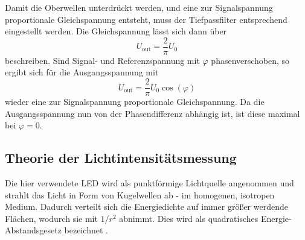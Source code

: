 Damit die Oberwellen unterdrückt werden, und eine zur Signalspannung proportionale
Gleichspannung entsteht, muss der Tiefpassfilter entsprechend eingestellt werden.
Die Gleichspannung lässt sich dann über
\begin{equation}
  U_\text{out}=\frac{2}{\pi}U_0
\end{equation}
beschreiben.
Sind Signal- und Referenzspannung mit $\varphi$ phasenverschoben, so ergibt sich für
die Ausgangsspannung mit
\begin{equation}
  U_\text{out}=\frac{2}{\pi}U_0\cos(\varphi) \label{eqn:out}
\end{equation}
wieder eine zur Signalspannung proportionale Gleichspannung. Da die Ausgangsspannung
nun von der Phasendifferenz abhängig ist, ist diese maximal bei $\varphi=0$.

\subsection{Theorie der Lichtintensitätsmessung}
Die hier verwendete LED wird als punktförmige Lichtquelle angenommen und strahlt
das Licht in Form von Kugelwellen ab - im homogenen, isotropen Medium. Dadurch verteilt
sich die Energiedichte auf immer größer werdende Flächen, wodurch sie mit $1/r^2$ abnimmt.
Dies wird als quadratisches Energie-Abstandsgesetz bezeichnet \cite{chemie}.
